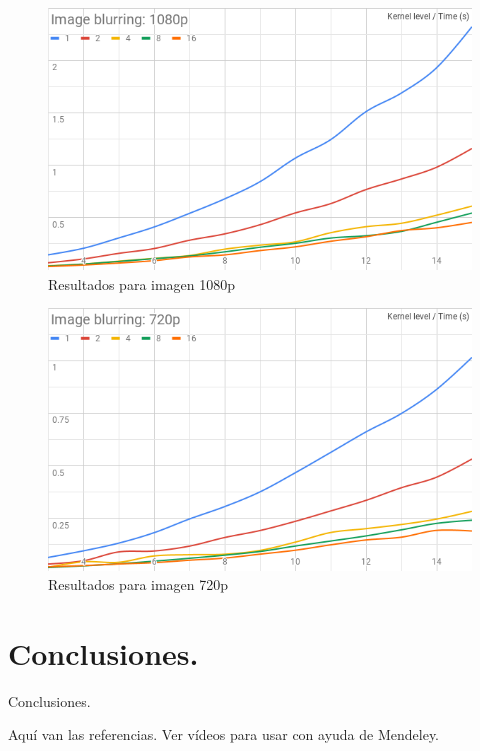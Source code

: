 \documentclass{IEEEtran}
\begin{document}
\begin{figure}[htp]
\centering
\includegraphics[width=\linewidth]{images/1080p.png}
\caption{Resultados para imagen 1080p}
\label{1080pplot}
\end{figure}

\begin{figure}[htp]
\centering
\includegraphics[width=\linewidth]{images/720p.png}
\caption{Resultados para imagen 720p}
\label{720pplot}
\end{figure}


\section*{Conclusiones.}


Conclusiones.

\noindent 


Aquí van las referencias. Ver vídeos para usar con ayuda de Mendeley.



\end{document}
